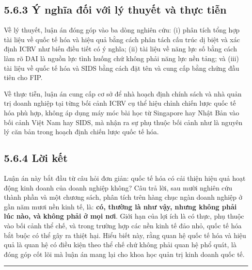 \documentclass[
  a4paper,
  13pt]{extreport}
\begin{document}
\hypertarget{uxfd-nghux129a-ux111ux1ed1i-vux1edbi-luxfd-thuyux1ebft-vuxe0-thux1ef1c-tiux1ec5n}{%
\subsection{5.6.3 Ý nghĩa đối với lý thuyết và thực
tiễn}\label{uxfd-nghux129a-ux111ux1ed1i-vux1edbi-luxfd-thuyux1ebft-vuxe0-thux1ef1c-tiux1ec5n}}

Về lý thuyết, luận án đóng góp vào ba dòng nghiên cứu: (i) phân tích
tổng hợp tài liệu về quốc tế hóa và hiệu quả bằng cách phân tách cấu
trúc dị biệt và xác định ICRV như biến điều tiết có ý nghĩa; (ii) tài
liệu về năng lực số bằng cách làm rõ DAI là nguồn lực tình huống chứ
không phải năng lực nền tảng; và (iii) tài liệu về quốc tế hóa và SIDS
bằng cách đặt tên và cung cấp bằng chứng đầu tiên cho FIP.

Về thực tiễn, luận án cung cấp cơ sở để nhà hoạch định chính sách và nhà
quản trị doanh nghiệp tại từng bối cảnh ICRV cụ thể hiệu chỉnh chiến
lược quốc tế hóa phù hợp, không áp dụng máy móc bài học từ Singapore hay
Nhật Bản vào bối cảnh Việt Nam hay SIDS, mà nhận ra sự phụ thuộc bối
cảnh như là nguyên lý căn bản trong hoạch định chiến lược quốc tế hóa.

\hypertarget{lux1eddi-kux1ebft}{%
\subsection{5.6.4 Lời kết}\label{lux1eddi-kux1ebft}}

Luận án này bắt đầu từ câu hỏi đơn giản: quốc tế hóa có cải thiện hiệu
quả hoạt động kinh doanh của doanh nghiệp không? Câu trả lời, sau mười
nghiên cứu thành phần và một chương sách, phân tích trên hàng chục ngàn
doanh nghiệp ở gần năm mươi nền kinh tế, là: \textbf{có, thường là như
vậy, nhưng không phải lúc nào, và không phải ở mọi nơi}. Giới hạn của
lợi ích là có thực, phụ thuộc vào bối cảnh thể chế, và trong trường hợp
các nền kinh tế đảo nhỏ, quốc tế hóa bắt buộc có thể gây ra thiệt hại.
Hiểu biết này, rằng quan hệ quốc tế hóa và hiệu quả là quan hệ có điều
kiện theo thể chế chứ không phải quan hệ phổ quát, là đóng góp cốt lõi
mà luận án mang lại cho khoa học quản trị kinh doanh quốc tế.

\begin{center}\rule{0.5\linewidth}{0.5pt}\end{center}
\end{document}
